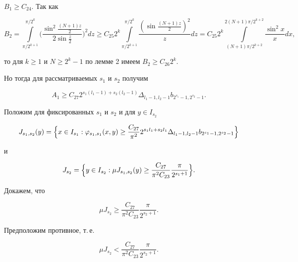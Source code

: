 $B_1\ge C_{24}$. Так как 


$$


B_2=\int\limits^{\pi/2^k}_{\pi/2^{k+1}} 


\biggl(\frac{\sin^2\frac{(N+1)z}{2}}{2\sin\frac{z}{2}}\biggr)^2 dz \ge  


C_{25}2^k\int\limits^{\pi/2^k}_{\pi/2^{k+1}} 


\frac{(\sin\frac{(N+1)z}{2})^2}{z}dz= 


C_{25}2^k\int\limits^{2(N+1)\pi/2^{k+2}}_{(N+1)\pi/2^{k+2}} 


\frac{\sin^2x}{x}dx, 


$$


то для $k\ge 1$ и $N\ge 2^k-1$ по лемме 2 имеем $B_2\ge C_{26}2^k$. 


 


Но тогда для рассматриваемых $s_1$ и $s_2$ получим 


\begin{equation} 


A_1\ge C_{27}2^{s_1(l_1-1)+s_2(l_2-1)} 


\Delta_{l_1-1,l_2-1}b_{2^{s_1}-1,2^{s_2}-1}.\tag{5} 


\end{equation} 


Положим для фиксированных $s_1$ и $s_2$ и для $y\in I_{s_2}$ 


$$ 


J_{s_1,s_2}(y)=\Bigl\{x\in I_{s_1}:\varphi_{s_1,s_1}(x,y)\ge 


\frac{C_{27}}{\pi^2}2^{s_1l_1+s_2l_1} 


\Delta_{l_1-1,l_2-1}b_{2^{s_1}-1,2^{s_2}-1}\Bigr\} 


$$ 


и 


$$ 


J_{s_2}=\Bigl\{y\in I_{s_2}:\mu J_{s_1,s_2}(y)\ge 


\frac{C_{27}}{\pi^2C_{23}}\frac{\pi}{2^{s_1+1}}\Bigr\}. 


$$ 


Докажем, что 


$$ 


\mu J_{s_2}\ge \frac{C_{27}}{\pi^2C_{23}}\frac{\pi}{2^{s_2+1}}. 


$$ 


Предположим противное, т.\,е. 


\begin{equation} 


\mu J_{s_2} <\frac{C_{27}}{\pi^2C_{23}}\frac{\pi}{2^{s_2+1}}.\tag{6} 


\end{equation} 


